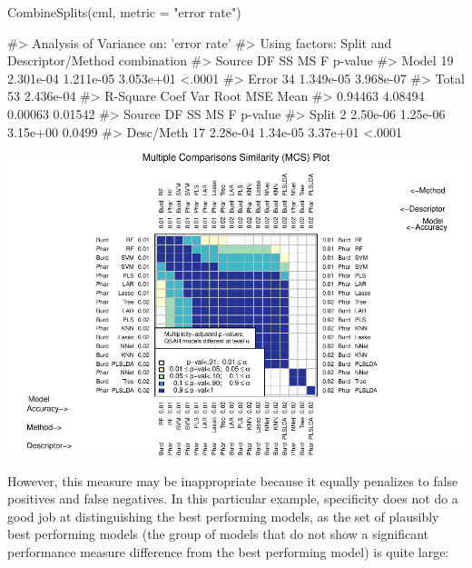 \begin{Schunk}
\begin{Sinput}
CombineSplits(cml, metric = "error rate")
\end{Sinput}
\begin{Soutput}
#>    Analysis of Variance on: 'error rate'
#>  Using factors: Split and Descriptor/Method combination
#> Source    DF          SS          MS           F   p-value   
#> Model     19   2.301e-04   1.211e-05   3.053e+01    <.0001   
#> Error     34   1.349e-05   3.968e-07   
#> Total     53   2.436e-04   
#>       R-Square   Coef Var   Root MSE       Mean   
#>        0.94463    4.08494    0.00063    0.01542   
#> Source       DF         SS         MS          F   p-value   
#> Split         2   2.50e-06   1.25e-06   3.15e+00    0.0499   
#> Desc/Meth    17   2.28e-04   1.34e-05   3.37e+01    <.0001
\end{Soutput}

\includegraphics{chemmodlabRJournal_files/figure-latex/CombineSplits_er-1} \end{Schunk}

However, this measure may be inappropriate because it equally penalizes
to false positives and false negatives. In this particular example,
specificity does not do a good job at distinguishing the best performing
models, as the set of plausibly best performing models (the group of
models that do not show a significant performance measure difference
from the best performing model) is quite large:

